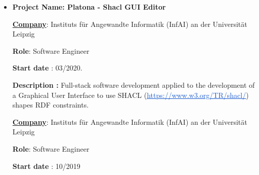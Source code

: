\begin{itemize}
    \item \textbf{Project Name: Platona - Shacl GUI Editor}

\begin{justify}
{\fontsize{10pt}{12.0pt}\selectfont \textbf{\uline{Company\tab }}: Instituts für Angewandte Informatik (InfAI) an der Universität Leipzig\par}
\end{justify}\par

{\fontsize{10pt}{12.0pt}\selectfont \textbf{Role}\tab \tab : Software Engineer\par}\par

{\fontsize{10pt}{12.0pt}\selectfont \textbf{Start date} \tab : 03/2020.\par}\par

\begin{justify}
{\fontsize{10pt}{12.0pt}\selectfont \textbf{Description \tab : }Full-stack\textbf{ }software development applied to the development of a Graphical User Interface to use SHACL (\href{https://www.w3.org/TR/shacl/}{\textcolor[HTML]{1155CC}{\ul{https://www.w3.org/TR/shacl/}}}) shapes RDF constraints.\par}
\end{justify}\par


\vspace{\baselineskip}
\par

\begin{justify}
{\fontsize{10pt}{12.0pt}\selectfont \textbf{\uline{Company\tab }}: Instituts für Angewandte Informatik (InfAI) an der Universität Leipzig\par}
\end{justify}\par

{\fontsize{10pt}{12.0pt}\selectfont \textbf{Role}\tab \tab : Software Engineer\par}\par

{\fontsize{10pt}{12.0pt}\selectfont \textbf{Start date} \tab : 10/2019\par}\par


\end{itemize}
